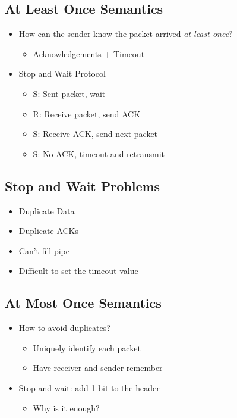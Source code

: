 \subsection{At Least Once Semantics}
\begin{itemize}[nosep]
    \item How can the sender know the packet arrived \emph{at least once}?
          \begin{itemize}[nosep]
              \item Acknowledgements + Timeout
          \end{itemize}
    \item Stop and Wait Protocol
          \begin{itemize}[nosep]
              \item S: Sent packet, wait
              \item R: Receive packet, send ACK
              \item S: Receive ACK, send next packet
              \item S: No ACK, timeout and retransmit
          \end{itemize}
\end{itemize}

\subsection{Stop and Wait Problems}
\begin{itemize}[nosep]
    \item Duplicate Data
    \item Duplicate ACKs
    \item Can't fill pipe
    \item Difficult to set the timeout value
\end{itemize}

\subsection{At Most Once Semantics}
\begin{itemize}[nosep]
    \item How to avoid duplicates?
          \begin{itemize}[nosep]
              \item Uniquely identify each packet
              \item Have receiver and sender remember
          \end{itemize}
    \item Stop and wait: add 1 bit to the header
          \begin{itemize}[nosep]
              \item Why is it enough?
          \end{itemize}
\end{itemize}

